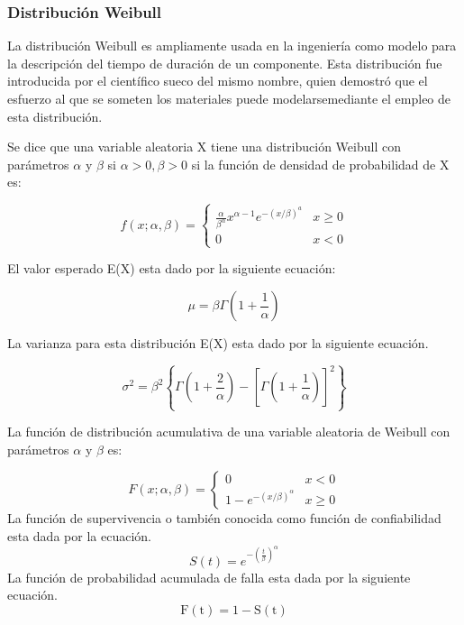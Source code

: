 \documentclass[
  11pt,
  bookmarksnumbered]{article}
\begin{document}
\hypertarget{distribuciuxf3n-weibull}{%
\subsubsection{Distribución Weibull}\label{distribuciuxf3n-weibull}}

La distribución Weibull es ampliamente usada en la ingeniería como modelo para la descripción del tiempo de duración de un componente.
Esta distribución fue introducida por el científico sueco del mismo nombre, quien demostró que el esfuerzo al que se someten los materiales puede modelarsemediante el empleo de esta distribución.
\textcite{Castaneda2004}

Se dice que una variable aleatoria X tiene una distribución Weibull con parámetros \(\alpha\) y \(\beta\) si \(\alpha >0, \beta >0\) si la función de densidad de probabilidad de X es:


 \begin{equation}
    f(x ; \alpha, \beta)=\left\{\begin{array}{cc}
        \frac{\alpha}{\beta^{\alpha}} x^{\alpha-1} e^{-(x / \beta)^{a}} & x \geq 0 \\
        0 & x<0
    \end{array}\right.
 \end{equation}

El valor esperado E(X) esta dado por la siguiente ecuación:

\begin{equation}
    \mu=\beta \Gamma\left(1+\frac{1}{\alpha}\right)
\end{equation}

La varianza para esta distribución E(X) esta dado por la siguiente ecuación.

\begin{equation}
    \sigma^{2}=\beta^{2}\left\{\Gamma\left(1+\frac{2}{\alpha}\right)-\left[\Gamma\left(1+\frac{1}{\alpha}\right)\right]^{2}\right\}
\end{equation}

La función de distribución acumulativa de una variable aleatoria de Weibull con parámetros \(\alpha\) y \(\beta\) es:

\begin{equation}
    F(x ; \alpha, \beta)=\left\{\begin{array}{cc}
        0 & x<0 \\
        1-e^{-(x / \beta)^{\alpha}} & x \geq 0
    \end{array}\right.
\end{equation}
  La función de supervivencia o también conocida como función de confiabilidad esta dada por la ecuación.
 \begin{equation}
    S(t)=e^{-\left(\frac{t}{\beta}\right)^{\alpha}}
    \label{eq:5}
 \end{equation}
  La función de probabilidad acumulada de falla esta dada por la siguiente ecuación.
 \begin{equation}
    \mathrm{F}(\mathrm{t})=1-\mathrm{S}(\mathrm{t})
    \label{Confiabilidad}
 \end{equation}
\end{document}
